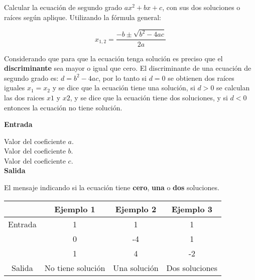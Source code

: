 
\question Calcular la ecuación de segundo grado $ax^2 + bx + c$, con sus dos
          soluciones o raíces según aplique. Utilizando la fórmula general:

\begin{displaymath}
  x_{1,2} = \frac{-b \pm \sqrt{b^2 - 4ac}}{2a}
\end{displaymath}

Considerando que para que la ecuación tenga solución es preciso que el
\textbf{discriminante} sea mayor o igual que cero. El discriminante de una
ecuación de segundo grado es: $d = b^2 - 4ac$, por lo tanto si $d=0$ se
obtienen dos raíces iguales $x_1 = x_2$ y se dice que la ecuación tiene una
solución, si $d >0$ se calculan las dos raices $x1$ y $x2$, y se dice que la
ecuación tiene dos soluciones, y si $d<0$ entonces la ecuación no tiene
solución.

\textbf{Entrada}

Valor del coeficiente $a$. \\
Valor del coeficiente $b$. \\
Valor del coeficiente $c$. \\

\textbf{Salida}

El mensaje indicando si la ecuación tiene \textbf{cero}, \textbf{una} o
\textbf{dos} soluciones.

\begin{center}
  \begin{tabular}{|c|c|c|c|}
     \hline
     \rowcolor[HTML]{C0C0C0}
             & Ejemplo 1 & Ejemplo 2 & Ejemplo 3 \\
     \hline
     Entrada & 1   &  1  &  1 \\
             & 0   &  -4  & 1 \\
             & 1   &  4  & -2 \\
     \hline
     Salida  & No tiene solución & Una solución & Dos soluciones \\
     \hline
  \end{tabular}
\end{center}
